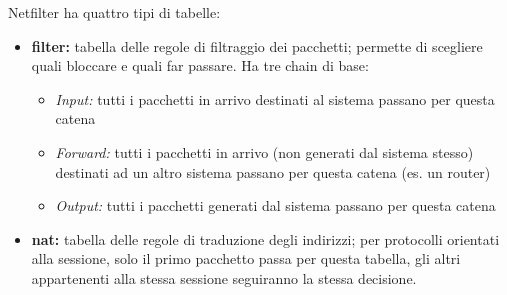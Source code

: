 \noindent Netfilter ha quattro tipi di tabelle:
\begin{itemize}
    \item \textbf{filter:} tabella delle regole di filtraggio dei pacchetti; permette di scegliere 
    quali bloccare e quali far passare. Ha tre chain di base:
    \begin{itemize}
        \item \textit{Input:} tutti i pacchetti in arrivo destinati al sistema passano per questa catena 
        \item \textit{Forward:} tutti i pacchetti in arrivo (non generati dal sistema stesso) destinati ad un altro sistema passano per questa catena (es. un router)
        \item \textit{Output:} tutti i pacchetti generati dal sistema passano per questa catena
    \end{itemize}
    \item \textbf{nat:} tabella delle regole di traduzione degli indirizzi; per protocolli orientati alla sessione, solo 
    il primo pacchetto passa per questa tabella, gli altri appartenenti alla stessa sessione seguiranno la stessa decisione.
    

\end{itemize}
